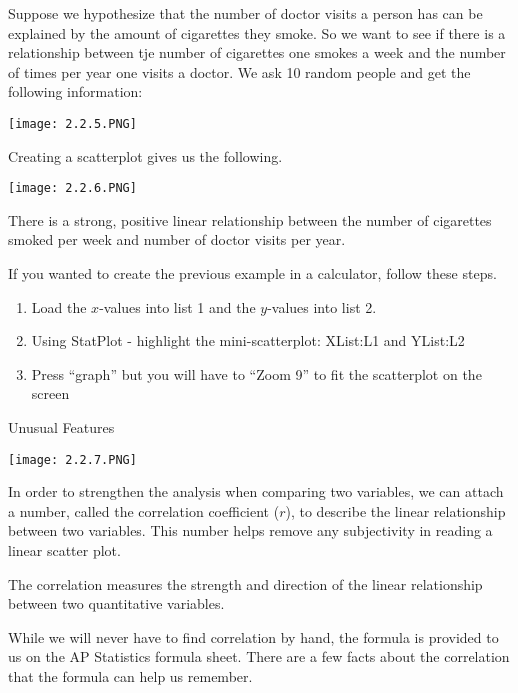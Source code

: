 \documentclass[../stats.tex]{subfiles}
\begin{document}
\pagebreak
\begin{example}
    Suppose we hypothesize that the number of doctor visits a person has can be explained by the amount of cigarettes they smoke.
    So we want to see if there is a relationship between tje number of cigarettes one smokes a week and the number of times per year one visits a doctor.
    We ask 10 random people and get the following information: 
    \begin{center}
        \texttt{[image: 2.2.5.PNG]}
    \end{center}
    Creating a scatterplot gives us the following.
    \begin{center}
        \texttt{[image: 2.2.6.PNG]}
    \end{center}

    There is a strong, positive linear relationship between the number of cigarettes smoked per week and number of doctor visits per year.
\end{example}

If you wanted to create the previous example in a calculator, follow these steps.
\begin{enumerate}
    \item Load the $x$-values into list 1 and the $y$-values into list 2.
    \item Using StatPlot - highlight the mini-scatterplot: XList:L1 and YList:L2 
    \item Press ``graph'' but you will have to ``Zoom 9'' to fit the scatterplot on the screen 
\end{enumerate}

Unusual Features
\begin{center}
    \texttt{[image: 2.2.7.PNG]}
\end{center}

In order to strengthen the analysis when comparing two variables, we can attach a number, called the correlation coefficient ($r$), to describe the linear relationship between two variables. This number helps remove any subjectivity in reading a linear scatter plot.

The correlation measures the strength and direction of the linear relationship between two quantitative variables.

While we will never have to find correlation by hand, the formula is provided to us on the AP Statistics formula sheet. There are a few facts about the correlation that the formula can help us remember.
\end{document}
